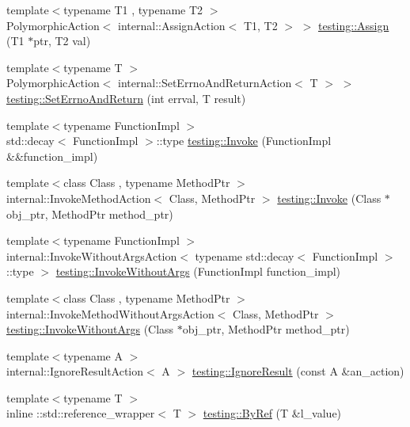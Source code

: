 \begin{DoxyCompactItemize}
\item 
{\footnotesize template$<$typename T1 , typename T2 $>$ }\\Polymorphic\+Action$<$ internal\+::\+Assign\+Action$<$ T1, T2 $>$ $>$ \mbox{\hyperlink{namespacetesting_a630f14770743960d9d1b7c71cfd9034c}{testing\+::\+Assign}} (T1 $\ast$ptr, T2 val)
\item 
{\footnotesize template$<$typename T $>$ }\\Polymorphic\+Action$<$ internal\+::\+Set\+Errno\+And\+Return\+Action$<$ T $>$ $>$ \mbox{\hyperlink{namespacetesting_a6f466024040fa05349773514ce1c6647}{testing\+::\+Set\+Errno\+And\+Return}} (int errval, T result)
\item 
{\footnotesize template$<$typename Function\+Impl $>$ }\\std\+::decay$<$ Function\+Impl $>$\+::type \mbox{\hyperlink{namespacetesting_af5cacf4475557b5a3e37af3836564235}{testing\+::\+Invoke}} (Function\+Impl \&\&function\+\_\+impl)
\item 
{\footnotesize template$<$class Class , typename Method\+Ptr $>$ }\\internal\+::\+Invoke\+Method\+Action$<$ Class, Method\+Ptr $>$ \mbox{\hyperlink{namespacetesting_af6a7c9befa6ff00198434995586151c3}{testing\+::\+Invoke}} (Class $\ast$obj\+\_\+ptr, Method\+Ptr method\+\_\+ptr)
\item 
{\footnotesize template$<$typename Function\+Impl $>$ }\\internal\+::\+Invoke\+Without\+Args\+Action$<$ typename std\+::decay$<$ Function\+Impl $>$\+::type $>$ \mbox{\hyperlink{namespacetesting_aabc08d610483908c8346f2e3318ad449}{testing\+::\+Invoke\+Without\+Args}} (Function\+Impl function\+\_\+impl)
\item 
{\footnotesize template$<$class Class , typename Method\+Ptr $>$ }\\internal\+::\+Invoke\+Method\+Without\+Args\+Action$<$ Class, Method\+Ptr $>$ \mbox{\hyperlink{namespacetesting_ab2961856113ff9af02fdf12c71b8a5f5}{testing\+::\+Invoke\+Without\+Args}} (Class $\ast$obj\+\_\+ptr, Method\+Ptr method\+\_\+ptr)
\item 
{\footnotesize template$<$typename A $>$ }\\internal\+::\+Ignore\+Result\+Action$<$ A $>$ \mbox{\hyperlink{namespacetesting_a257c9395b54e9267a0348a6310128889}{testing\+::\+Ignore\+Result}} (const A \&an\+\_\+action)
\item 
{\footnotesize template$<$typename T $>$ }\\inline \+::std\+::reference\+\_\+wrapper$<$ T $>$ \mbox{\hyperlink{namespacetesting_a1f94a81e042d7c40c8359c1471fbb61e}{testing\+::\+By\+Ref}} (T \&l\+\_\+value)
\end{DoxyCompactItemize}


